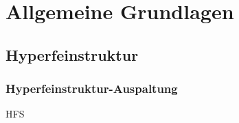\section{Allgemeine Grundlagen}
\subsection{Hyperfeinstruktur}

\begin{frame}
\frametitle{Hyperfeinstruktur-Auspaltung}
  HFS
\end{frame}

